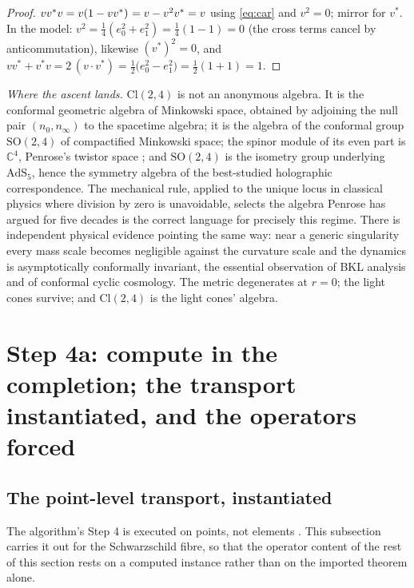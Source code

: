 \documentclass[11pt]{article}
\theoremstyle{definition}
\newcommand{\Cl}{\mathrm{Cl}}
\newcommand{\C}{\mathbb{C}}
\newcommand{\nO}{n_0}
\newcommand{\nInf}{n_\infty}
\begin{document}
\begin{proof}
$v v^* v = v(1 - v v^*)^{\vphantom{*}} = v - v^2 v^* = v$ using \eqref{eq:car} and $v^2 = 0$; mirror for $v^*$. In the model: $v^2 = \tfrac14(e_0^2 + e_1^2) = \tfrac14(1 - 1) = 0$ (the cross terms cancel by anticommutation), likewise $(v^*)^2 = 0$, and $v v^* + v^* v = 2\,(v \cdot v^*) = \tfrac12\bigl(e_0^2 - e_1^2\bigr) = \tfrac12(1 + 1) = 1$.
\end{proof}

\emph{Where the ascent lands.} $\Cl(2,4)$ is not an anonymous algebra. It is the conformal geometric algebra of Minkowski space, obtained by adjoining the null pair $(\nO, \nInf)$ to the spacetime algebra; it is the algebra of the conformal group $\mathrm{SO}(2,4)$ of compactified Minkowski space; the spinor module of its even part is $\C^4$, Penrose's twistor space \cite{Penrose1967}; and $\mathrm{SO}(2,4)$ is the isometry group underlying $\mathrm{AdS}_5$, hence the symmetry algebra of the best-studied holographic correspondence. The mechanical rule, applied to the unique locus in classical physics where division by zero is unavoidable, selects the algebra Penrose has argued for five decades is the correct language for precisely this regime. There is independent physical evidence pointing the same way: near a generic singularity every mass scale becomes negligible against the curvature scale and the dynamics is asymptotically conformally invariant, the essential observation of BKL analysis and of conformal cyclic cosmology. The metric degenerates at $r = 0$; the light cones survive; and $\Cl(2,4)$ is the light cones' algebra.

\section{Step 4a: compute in the completion; the transport instantiated, and the operators forced}\label{sec:operators}

\subsection{The point-level transport, instantiated}\label{subsec:lift}

The algorithm's Step 4 is executed on points, not elements \cite[\S 8.1, Step 4]{ButlerT1}. This subsection carries it out for the Schwarzschild fibre, so that the operator content of the rest of this section rests on a computed instance rather than on the imported theorem alone.
\end{document}
